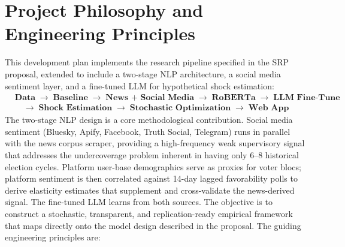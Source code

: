 \documentclass[11pt]{article}
\begin{document}
\vspace{10pt}

\section{Project Philosophy and Engineering Principles}

This development plan implements the research pipeline specified in the SRP proposal,
extended to include a two-stage NLP architecture, a social media sentiment layer, and
a fine-tuned LLM for hypothetical shock estimation:
\begin{align*}
  &\textbf{Data} \;\to\;
   \textbf{Baseline} \;\to\;
   \textbf{News + Social Media} \;\to\;
   \textbf{RoBERTa} \;\to\;
   \textbf{LLM Fine-Tune} \\
  &\quad\to\;
   \textbf{Shock Estimation} \;\to\;
   \textbf{Stochastic Optimization} \;\to\;
   \textbf{Web App}
\end{align*}
The two-stage NLP design is a core methodological contribution. Social media sentiment
(Bluesky, Apify, Facebook, Truth Social, Telegram) runs in parallel with the news corpus scraper,
providing a high-frequency weak supervisory signal that addresses the undercoverage
problem inherent in having only 6--8 historical election cycles. Platform user-base
demographics serve as proxies for voter blocs; platform sentiment is then correlated
against 14-day lagged favorability polls to derive elasticity estimates that supplement
and cross-validate the news-derived signal. The fine-tuned LLM learns from both sources.
The objective is to construct a stochastic, transparent, and replication-ready empirical framework
that maps directly onto the model design described in the proposal. The guiding engineering
principles are:
\end{document}
